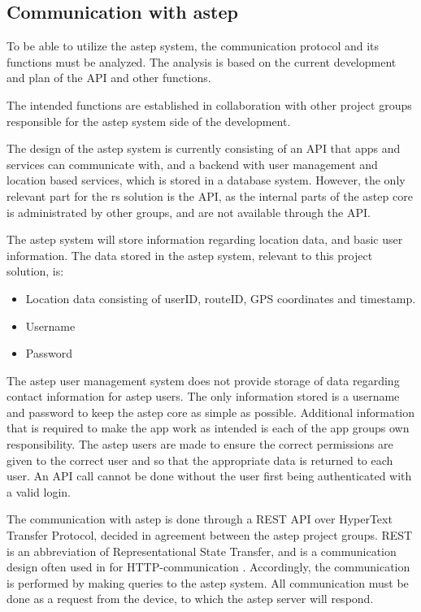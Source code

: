 \subsection{Communication with \gls{astep}}\label{ssec:communicationwithastep}
To be able to utilize the \gls{astep} system, the communication protocol and its functions must be analyzed. 
The analysis is based on the current development and plan of the API and other functions.

The intended functions are established in collaboration with other project groups responsible for the \gls{astep} system side of the development. 

The design of the \gls{astep} system is currently consisting of an API that apps and services can communicate with, and a backend with user management and location based services, which is stored in a database system.
However, the only relevant part for the \gls{rs} solution is the API, as the internal parts of the \gls{astep} core is administrated by other groups, and are not available through the API.

The \gls{astep} system will store information regarding location data, and basic user information. 
The data stored in the \gls{astep} system, relevant to this project solution, is:
\begin{itemize}
	\item Location data consisting of userID, routeID, GPS coordinates and timestamp.
	\item Username
	\item Password
\end{itemize}

The \gls{astep} user management system does not provide storage of data regarding contact information for \gls{astep} users.
The only information stored is a username and password to keep the \gls{astep} core as simple as possible.
Additional information that is required to make the app work as intended is each of the app groups own responsibility.
The \gls{astep} users are made to ensure the correct permissions are given to the correct user and so that the appropriate data is returned to each user.
An API call cannot be done without the user first being authenticated with a valid login.

The communication with \gls{astep} is done through a REST API over HyperText Transfer Protocol, decided in agreement between the \gls{astep} project groups.
REST is an abbreviation of Representational State Transfer, and is a communication design often used in for HTTP-communication \cite{REST}.
Accordingly, the communication is performed by making queries to the \gls{astep} system. 
All communication must be done as a request from the device, to which the \gls{astep} server will respond.

